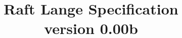 \documentclass[11pt, letterpaper, notitlepage]{book}
\begin{document}
\frontmatter
\title{Raft Lange Specification \\ version 0.00b}
\maketitle
\newpage
\tableofcontents


%
%
\end{document}
